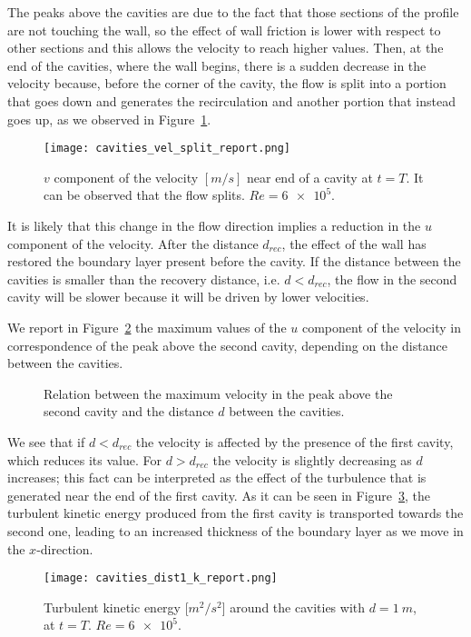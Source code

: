 The peaks above the cavities are due to the fact that those sections of the 
profile are not touching the wall, so the
effect of wall friction is lower with respect to
other sections and this allows the velocity to 
reach higher values.
Then, at the end of the cavities, where the wall begins,
there is a sudden 
decrease in the velocity because, before the corner of the cavity, the flow is 
split into a portion that goes down and generates the recirculation and another 
portion that instead goes up, as we observed in Figure~\ref{fig:vel_split}.
\begin{figure}
	\centering
	\texttt{[image: cavities\_vel\_split\_report.png]}
	\caption[$v$ component of the velocity near end of a cavity in the cavities 
	problem]{$v$ component of the velocity $[\si{m/s}]$ near end of a cavity at 
	$t=T$. It can be observed that the flow splits. $Re = \num{6e5}$.}
	\label{fig:vel_split}
\end{figure}
It is likely that this change in the flow direction implies a reduction in the 
$u$ component of the velocity. After the 
distance $d_{rec}$, the effect of the wall has restored the boundary layer present before the cavity. If the distance between the 
cavities is smaller than the recovery distance, i.e. $d < d_{rec}$, the flow in 
the second cavity will be slower because it will be driven by lower velocities.

We report in Figure~\ref{fig:velpeaks} the maximum values of the $u$ component 
of the velocity in correspondence of the peak above the second cavity, 
depending on the distance between the cavities.
\begin{figure}
	\centering
	
	\caption[Relation between the maximum velocity above the second cavity and 
	the distance between the cavities]{Relation between the maximum velocity in the peak above the second cavity and the distance $d$ between the cavities.}
	\label{fig:velpeaks}
\end{figure}
We see that if $d < d_{rec}$ the velocity is affected by the presence of 
the first cavity, which reduces its value. For $d>d_{rec}$ the velocity is 
slightly decreasing as $d$ increases; this fact can be interpreted as the 
effect of the turbulence that 
is generated near the end of the first cavity. As it can be seen in 
Figure~\ref{fig:kd1}, the turbulent kinetic energy produced from the 
first cavity is transported towards the second one, leading to an increased 
thickness of the boundary layer as we move in the $x$-direction.
\begin{figure}
	\centering
	\texttt{[image: cavities\_dist1\_k\_report.png]}
	\caption[Turbulen kinetic energy in the cavities problem]{Turbulent kinetic energy [$\si{m^2/s^2}$] around the cavities with $d=\SI{1}{m}$, at $t=T$. $Re=\num{6e5}$.}
	\label{fig:kd1}
\end{figure}
%
